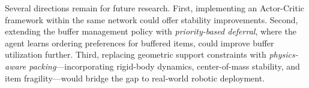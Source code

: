 \documentclass[runningheads]{llncs}
\begin{document}
Several directions remain for future research. First, implementing an Actor-Critic framework within the same network could offer stability improvements. Second, extending the buffer management policy with \emph{priority-based deferral}, where the agent learns ordering preferences for buffered items, could improve buffer utilization further. Third, replacing geometric support constraints with \emph{physics-aware packing}---incorporating rigid-body dynamics, center-of-mass stability, and item fragility---would bridge the gap to real-world robotic deployment.



\end{document}
